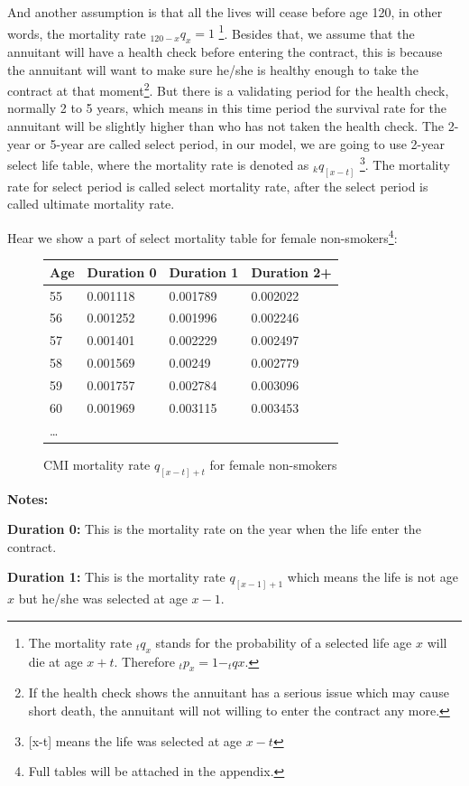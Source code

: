 \documentclass{report}
\begin{document}
And another assumption is that all the lives will cease before age 120, in other words, the mortality rate $_{120-x}q_{x}=1$ \footnote{The mortality rate $_tq_{x}$ stands for the probability of a selected life age $x$ will die at age $x+t$. Therefore $_tp_{x} = 1- _tq{x}$.}. Besides that, we assume that the annuitant will have a health check before entering the contract, this is because the annuitant will want to make sure he/she is healthy enough to take the contract at that moment\footnote{If the health check shows the annuitant has a serious issue which may cause short death, the annuitant will not willing to enter the contract any more.}. But there is a validating period for the health check, normally 2 to 5 years, which means in this time period the survival rate for the annuitant will be slightly higher than who has not taken the health check. The 2-year or 5-year are called select period, in our model, we are going to use 2-year select life table, where the mortality rate is denoted as $_kq_{[x-t]}$ \footnote{[x-t] means the life was selected at age $x-t$}. The mortality rate for select period is called select mortality rate, after the select period is called ultimate mortality rate.

Hear we show a part of select mortality table for female non-smokers\footnote{Full tables will be attached in the appendix.}:



\begin{figure}[H]
    \centering
\begin{tabular}{p{2cm}p{2cm}p{2cm}p{2cm}}
Age              & Duration 0 & Duration 1 & Duration 2+    \\
\hline
55&0.001118&0.001789&0.002022    \\
56&0.001252&0.001996&0.002246  \\
57&0.001401&0.002229&0.002497\\
58&0.001569&0.00249&0.002779\\
59&0.001757&0.002784&0.003096\\
60&0.001969&0.003115&0.003453\\
\dots
\end{tabular}
\caption{CMI mortality rate $q_{[x-t]+t}$ for female non-smokers}
\end{figure}

\textbf{Notes:}

\textbf{Duration 0:} This is the mortality rate on the year when the life enter the contract.

\textbf{Duration 1:} This is the mortality rate $q_{[x-1]+1}$ which means the life is not age $x$ but he/she was selected at age $x-1$.
\end{document}
